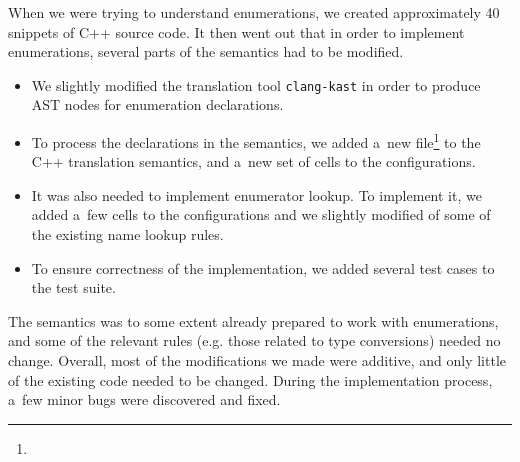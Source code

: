 \documentclass[nolot,nolof,nocover,printed]{fithesis3}
\newcommand{\clangKast}{\texttt{clang-kast}\xspace}
\begin{document}







When we were trying to understand enumerations, we created approximately 40 snippets of C++ source code. It then went out that in order to implement enumerations, several parts of the semantics had to be modified.
\begin{itemize}
\item We slightly modified the translation tool \clangKast in order to produce AST nodes for enumeration declarations.
\item To process the declarations in the semantics, we added a~new file\footnote{} to the C++ translation semantics, and a~new set of cells to the configurations.
\item It was also needed to implement enumerator lookup. To implement it, we added a~few cells to the configurations and we slightly modified of some of the existing name lookup rules.
\item To ensure correctness of the implementation, we added several test cases to the test suite.
\end{itemize}
The semantics was to some extent already prepared to work with enumerations, and some of the relevant rules (e.g. those related to type conversions) needed no change. Overall, most of the modifications we made were additive, and only little of the existing code needed to be changed. During the implementation process, a~few minor bugs were discovered and fixed. 
\end{document}
